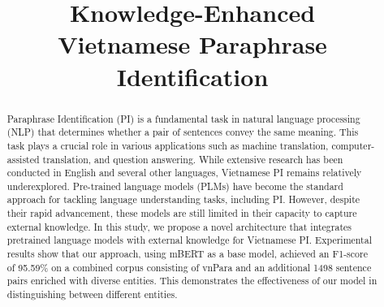 \documentclass{llncs}
\begin{document}
%
\title{Knowledge-Enhanced \\ Vietnamese Paraphrase Identification}
%
%
%
\author{
}
%
%
%
\institute{
}
%
%
\maketitle              %

\begin{abstract}

Paraphrase Identification (PI) is a fundamental task in natural language processing (NLP) that determines whether a pair of sentences convey the same meaning. This task plays a crucial role in various applications such as machine translation, computer-assisted translation, and question answering. While extensive research has been conducted in English and several other languages, Vietnamese PI remains relatively underexplored. Pre-trained language models (PLMs) have become the standard approach for tackling language understanding tasks, including PI. However, despite their rapid advancement, these models are still limited in their capacity to capture external knowledge. In this study, we propose a novel architecture that integrates pretrained language models with external knowledge for Vietnamese PI. Experimental results show that our approach, using mBERT as a base model, achieved an F1-score of 95.59\% on a combined corpus consisting of vnPara and an additional 1498 sentence pairs enriched with diverse entities. This demonstrates the effectiveness of our model in distinguishing between different entities.


\end{abstract}
%
%
%
\end{document}

